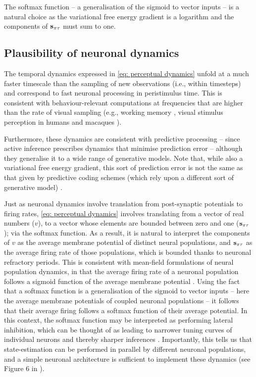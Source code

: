 \documentclass[review,12pt,authoryear]{elsarticle}
\begin{document}
The softmax function – a generalisation of the sigmoid to vector inputs – is a natural choice as the variational free energy gradient is a logarithm and the components of $\bold s_{\pi\tau}$ must sum to one.

\subsection{Plausibility of neuronal dynamics}

The temporal dynamics expressed in \eqref{eq: perceptual dynamics} unfold at a much faster timescale than the sampling of new observations (i.e., within timesteps) and correspond to fast neuronal processing in peristimulus time. This is consistent with behaviour-relevant computations at frequencies that are higher than the rate of visual sampling (e.g., working memory \citep{lundqvistGammaBetaBursts2016}, visual stimulus perception in humans \citep{hanslmayrPrestimulusOscillatoryPhase2013} and macaques \citep{rollsProcessingSpeedCerebral1994}).

Furthermore, these dynamics are consistent with predictive processing \citep{raoPredictiveCodingVisual1999,bastosCanonicalMicrocircuitsPredictive2012} -- since active inference prescribes dynamics that minimise prediction error -- although they generalise it to a wide range of generative models. Note that, while also a variational free energy gradient, this sort of prediction error is not the same as that given by predictive coding schemes (which rely upon a different sort of generative model) \citep{buckleyFreeEnergyPrinciple2017,fristonVariationalFreeEnergy2007,bogaczTutorialFreeenergyFramework2017}.

Just as neuronal dynamics involve translation from post-synaptic potentials to firing rates, \eqref{eq: perceptual dynamics} involves translating from a vector of real numbers ($v$), to a vector whose elements are bounded between zero and one ($\bold s_{\pi\tau}$); via the softmax function. As a result, it is natural to interpret the components of $v$ as the average membrane potential of distinct neural populations, and $\bold s_{\pi\tau}$ as the average firing rate of those populations, which is bounded thanks to neuronal refractory periods. This is consistent with mean-field formulations of neural population dynamics, in that the average firing rate of a neuronal population follows a sigmoid function of the average membrane potential \citep{marreirosPopulationDynamicsVariance2008,decoDynamicBrainSpiking2008,moranNeuralMassesFields2013}.
Using the fact that a softmax function is a generalisation of the sigmoid to vector inputs -- here the average membrane potentials of coupled neuronal populations -- it follows that their average firing follows a softmax function of their average potential. In this context, the softmax function may be interpreted as performing lateral inhibition, which can be thought of as leading to narrower tuning curves of individual neurons and thereby sharper inferences \citep{vonbekesySensoryInhibition1967}. Importantly, this tells us that state-estimation can be performed in parallel by different neuronal populations, and a simple neuronal architecture is sufficient to implement these dynamics (see Figure 6 in \citep{parrNeuronalMessagePassing2019}).
\end{document}
